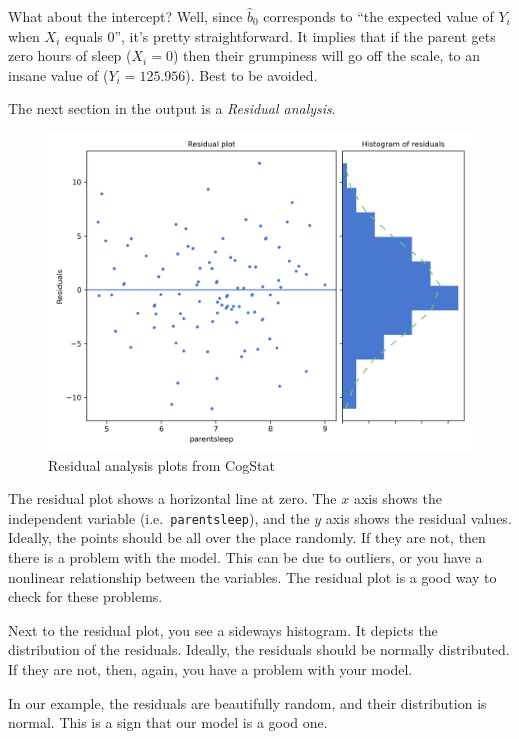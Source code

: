 \documentclass[
]{book}
\theoremstyle{definition}
\theoremstyle{definition}
\theoremstyle{definition}
\theoremstyle{definition}
\theoremstyle{remark}
\begin{document}
What about the intercept? Well, since \(\hat{b}_0\) corresponds to ``the expected value of \(Y_i\) when \(X_i\) equals 0'', it's pretty straightforward. It implies that if the parent gets zero hours of sleep (\(X_i =0\)) then their grumpiness will go off the scale, to an insane value of (\(Y_i = 125.956\)). Best to be avoided.

The next section in the output is a \emph{Residual analysis}.

\begin{figure}

{\centering \includegraphics[width=0.66\linewidth]{resources/image/parentresidualanalysis} 

}

\caption{Residual analysis plots from CogStat}\label{fig:residualanalysisplot}
\end{figure}

The residual plot shows a horizontal line at zero. The \(x\) axis shows the independent variable (i.e.~\texttt{parentsleep}), and the \(y\) axis shows the residual values. Ideally, the points should be all over the place randomly. If they are not, then there is a problem with the model. This can be due to outliers, or you have a nonlinear relationship between the variables. The residual plot is a good way to check for these problems.

Next to the residual plot, you see a sideways histogram. It depicts the distribution of the residuals. Ideally, the residuals should be normally distributed. If they are not, then, again, you have a problem with your model.

In our example, the residuals are beautifully random, and their distribution is normal. This is a sign that our model is a good one.
\end{document}
